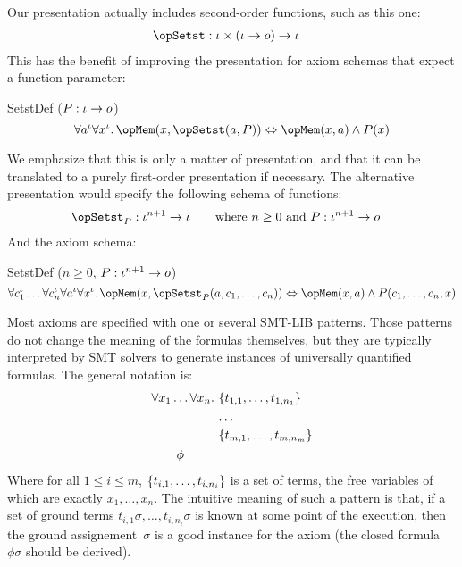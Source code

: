 \documentclass[11pt, a4paper, oneside]{article}
\begin{document}
Our presentation actually includes second-order functions, such as this one:
\begin{align*}
    \opSetst &: \idv \times (\idv \arr o) \arr \idv
\end{align*}
This has the benefit of improving the presentation for axiom schemas that expect a function parameter:
\begin{axioms}
\item[SetstDef ($P : \iota \rightarrow o$)] \[
        \forall a^\idv \forall x^\idv.\, \opMem(x, \opSetst(a, P)) \eqv \opMem(x, a) \wedge P(x)
    \]

\end{axioms}

We emphasize that this is only a matter of presentation, and that it can be translated to a purely first-order presentation if necessary.  The alternative presentation would specify the following schema of functions:
\begin{align*}
    \opSetst_P &: \idv^{n+1} \arr \idv  \qquad\text{where $n \ge 0$ and $P : \idv^{n+1} \arr o$}
\end{align*}
And the axiom schema:
\begin{axioms}
\item[SetstDef ($n \ge 0$, $P : \iota^{n+1} \rightarrow o$)] \[
        \forall c_1^\idv \dots \forall c_n^\idv \forall a^\idv \forall x^\idv.\, \opMem(x, \opSetst_P(a, c_1, \dots, c_n)) \eqv \opMem(x, a) \wedge P(c_1, \dots, c_n, x)
    \]

\end{axioms}

Most axioms are specified with one or several SMT-LIB patterns.  Those patterns do not change the meaning of the formulas themselves, but they are typically interpreted by SMT solvers to generate instances of universally quantified formulas.  The general notation is:
\[
    \begin{aligned}
        &\forall x_1 \dots \forall x_n.\, \begin{aligned}[t]
            &\left\{  t_{1,1}, \dots, t_{1,n_1}  \right\} \\
            &\dots \\
            &\left\{  t_{m,1}, \dots, t_{m,n_m}  \right\}
        \end{aligned} \\
        &\qquad \phi
    \end{aligned}
\]
Where for all $1 \le i \le m$, $\left\{  t_{i,1}, \dots, t_{i,n_i}  \right\}$ is a set of terms, the free variables of which are exactly $x_1,\dots,x_n$.  The intuitive meaning of such a pattern is that, if a set of ground terms $t_{i,1}\sigma, \dots, t_{i,n_i}\sigma$ is known at some point of the execution, then the ground assignement~$\sigma$ is a good instance for the axiom (the closed formula~$\phi\sigma$ should be derived).
\end{document}
